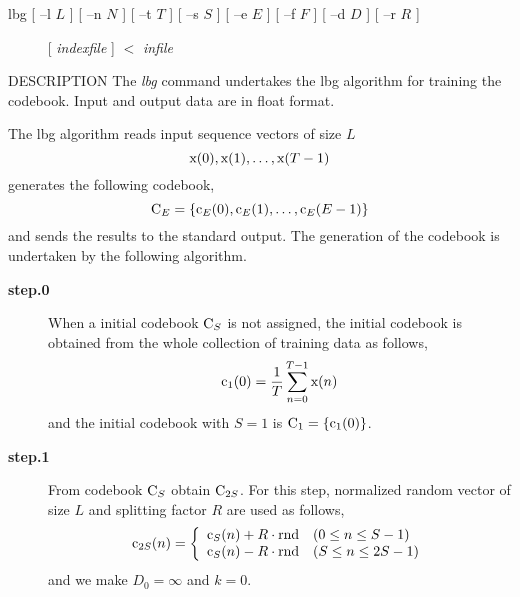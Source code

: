 
\begin{synopsis}
\item [lbg] [ --l $L$ ] [ --n $N$ ] [ --t $T$ ] [ --s $S$ ] [ --e $E$ ]
        [ --f $F$ ] [ --d $D$ ] [ --r $R$ ] 
\item [\ ~~~~] [ {\em indexfile} ] $<$ {\em infile}
\end{synopsis}

\begin{qsection}{DESCRIPTION}
The {\em lbg} command undertakes the lbg algorithm for training the
codebook.
Input and output data are in float format.

The lbg algorithm reads input sequence vectors of size $L$
\begin{displaymath} 
\mbox{\boldmath x}(0), \mbox{\boldmath x}(1), \ldots, \mbox{\boldmath x}(T-1)
\end{displaymath}
generates the following codebook,
\begin{displaymath}
\mbox{\boldmath C}_E =\{ \mbox{\boldmath c}_E(0), \mbox{\boldmath c}_E(1), 
\ldots, \mbox{\boldmath c}_E(E-1) \}
\end{displaymath}
and sends the results to the standard output.
The generation of the codebook is undertaken by the following algorithm.

\begin{description}
\item[\bf step.0~~~]
When a initial codebook $\mbox{\boldmath C}_S$ is not assigned,
the initial codebook is obtained from the whole collection of
training data as follows,
\begin{displaymath}
\mbox{\boldmath c}_1(0) = \frac{1}{T} \sum_{n=0}^{T-1} \mbox{\boldmath x}(n)
\end{displaymath}
and the initial codebook with $S = 1$ is $\mbox{\boldmath C}_1 = \{ \mbox{\boldmath c}_1(0) \}$.

\item[\bf step.1~~~]
From codebook $\mbox{\boldmath C}_{S}$ obtain $\mbox{\boldmath C}_{2S}$.
For this step, normalized random vector of size $L$ and splitting factor
$R$ are used as follows,
\begin{displaymath}
\mbox{\boldmath c}_{2S}(n)=\left\{ \begin{array}{ll}
\mbox{\boldmath c}_S(n) + R \cdot \mbox{\boldmath rnd} & ( 0 \le n \le S-1 ) \\
\mbox{\boldmath c}_S(n) - R \cdot \mbox{\boldmath rnd} & ( S \le n \le 2S-1 )
\end{array}\right.
\end{displaymath}
and we make $D_0 = \infty$ and $k = 0$.


\end{description}
\end{qsection}
